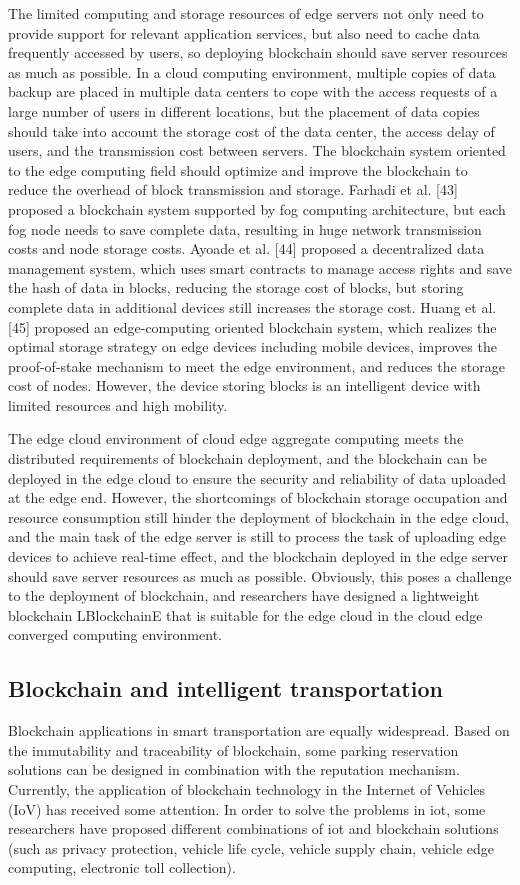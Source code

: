 \documentclass[lettersize,journal]{IEEEtran}
\begin{document}
The limited computing and storage resources of edge servers not only need to provide support for relevant application services, but also need to cache data frequently accessed by users, so deploying blockchain should save server resources as much as possible. In a cloud computing environment, multiple copies of data backup are placed in multiple data centers to cope with the access requests of a large number of users in different locations, but the placement of data copies should take into account the storage cost of the data center, the access delay of users, and the transmission cost between servers. The blockchain system oriented to the edge computing field should optimize and improve the blockchain to reduce the overhead of block transmission and storage. Farhadi et al. [43] proposed a blockchain system supported by fog computing architecture, but each fog node needs to save complete data, resulting in huge network transmission costs and node storage costs. Ayoade et al. [44] proposed a decentralized data management system, which uses smart contracts to manage access rights and save the hash of data in blocks, reducing the storage cost of blocks, but storing complete data in additional devices still increases the storage cost. Huang et al. [45] proposed an edge-computing oriented blockchain system, which realizes the optimal storage strategy on edge devices including mobile devices, improves the proof-of-stake mechanism to meet the edge environment, and reduces the storage cost of nodes. However, the device storing blocks is an intelligent device with limited resources and high mobility.

The edge cloud environment of cloud edge aggregate computing meets the distributed requirements of blockchain deployment, and the blockchain can be deployed in the edge cloud to ensure the security and reliability of data uploaded at the edge end. However, the shortcomings of blockchain storage occupation and resource consumption still hinder the deployment of blockchain in the edge cloud, and the main task of the edge server is still to process the task of uploading edge devices to achieve real-time effect, and the blockchain deployed in the edge server should save server resources as much as possible. Obviously, this poses a challenge to the deployment of blockchain, and researchers have designed a lightweight blockchain LBlockchainE that is suitable for the edge cloud in the cloud edge converged computing environment.
\subsection{Blockchain and intelligent transportation}
Blockchain applications in smart transportation are equally widespread. Based on the immutability and traceability of blockchain, some parking reservation solutions can be designed in combination with the reputation mechanism. Currently, the application of blockchain technology in the Internet of Vehicles (IoV) has received some attention. In order to solve the problems in iot, some researchers have proposed different combinations of iot and blockchain solutions (such as privacy protection, vehicle life cycle, vehicle supply chain, vehicle edge computing, electronic toll collection).
\end{document}
